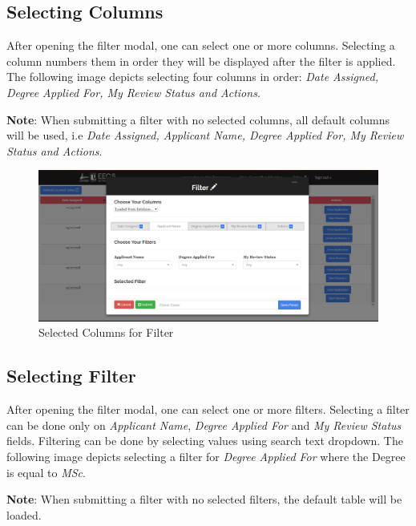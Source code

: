 \documentclass[fontsize=12pt,paper=letter,twoside]{scrartcl}
\begin{document}
\newpage
\subsection{Selecting Columns}

After opening the filter modal, one can select one or more columns. Selecting a column numbers them in order they will be displayed after the filter is applied. The following image depicts selecting four columns in order: \emph{Date Assigned, Degree Applied For, My Review Status and Actions}.

\bigskip
\noindent \textbf{Note}: When submitting a filter with no selected columns, all default columns will be used, i.e \emph{Date Assigned, Applicant Name, Degree Applied For, My Review Status and Actions}.

\begin{figure}[!htb]
\begin{center}
\includegraphics[width=.9\textwidth]{images/selected_col.png}
\end{center}
\caption{Selected Columns for Filter}
\label{fig:fm_selected_col}
\end{figure}

\subsection{Selecting Filter}

After opening the filter modal, one can select one or more filters. Selecting a filter can be done only on \emph{Applicant Name}, \emph{Degree Applied For} and \emph{My Review Status} fields. Filtering can be done by selecting values using search text dropdown. The following image depicts selecting a filter for \emph{Degree Applied For} where the Degree is equal to \emph{MSc}.

\bigskip
\noindent \textbf{Note}: When submitting a filter with no selected filters, the default table will be loaded.
\end{document}
